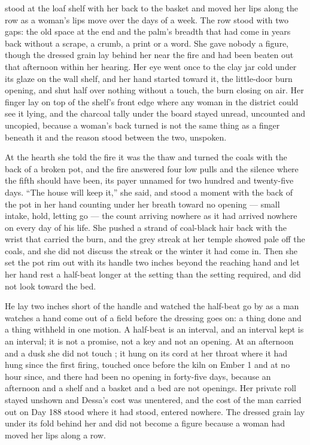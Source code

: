 \scenebreak

 stood at the loaf shelf with her back to the basket and moved her lips along the row as a woman's lips move over the days of a week. The row stood with two gaps: the old space at the end and the palm's breadth that had come in years back without a scrape, a crumb, a print or a word. She gave nobody a figure, though the dressed grain lay behind her near the fire and had been beaten out that afternoon within her hearing. Her eye went once to the clay jar cold under its glaze on the wall shelf, and her hand started toward it, the little-door burn opening, and shut half over nothing without a touch, the burn closing on air. Her finger lay on top of the shelf's front edge where any woman in the district could see it lying, and the charcoal tally under the board stayed unread, uncounted and uncopied, because a woman's back turned is not the same thing as a finger beneath it and the reason stood between the two, unspoken.

At the hearth she told the fire it was the thaw and turned the coals with the back of a broken pot, and the fire answered four low pulls and the silence where the fifth should have been, its payer unnamed for two hundred and twenty-five days. “The house will keep it,” she said, and stood a moment with the back of the pot in her hand counting under her breath toward no opening --- small intake, hold, letting go --- the count arriving nowhere as it had arrived nowhere on every day of his life. She pushed a strand of coal-black hair back with the wrist that carried the burn, and the grey streak at her temple showed pale off the coals, and she did not discuss the streak or the winter it had come in. Then she set the pot rim out with its handle two inches beyond the reaching hand and let her hand rest a half-beat longer at the setting than the setting required, and did not look toward the bed.

He lay two inches short of the handle and watched the half-beat go by as a man watches a hand come out of a field before the dressing goes on: a thing done and a thing withheld in one motion. A half-beat is an interval, and an interval kept is an interval; it is not a promise, not a key and not an opening. At an afternoon and a dusk she did not touch ; it hung on its cord at her throat where it had hung since the first firing, touched once before the kiln on Ember 1 and at no hour since, and there had been no opening in forty-five days, because an afternoon and a shelf and a basket and a bed are not openings. Her private roll stayed unshown and Dessa's cost was unentered, and the cost of the man carried out on Day 188 stood where it had stood, entered nowhere. The dressed grain lay under its fold behind her and did not become a figure because a woman had moved her lips along a row.

